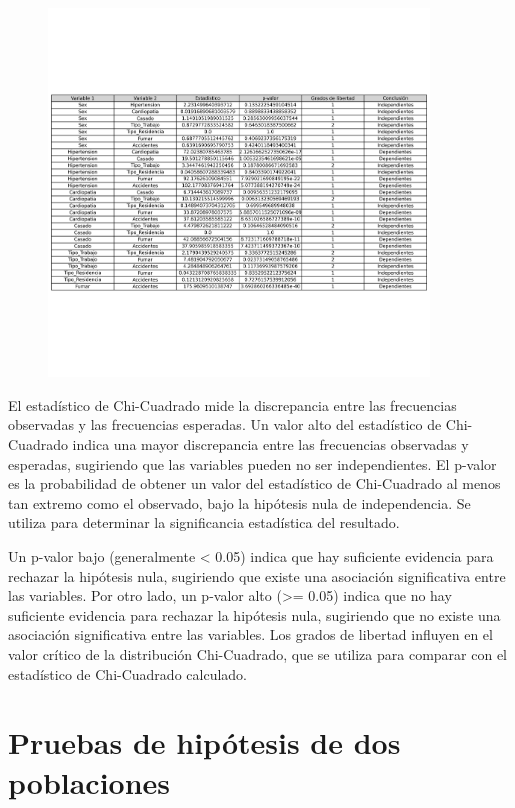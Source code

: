 \documentclass[a4paper, 12pt]{article}
\begin{document}
\begin{figure}[H]
    \centering
    \includegraphics[width=0.9\textwidth]{img/Tablas/test_chi_cuadrado.png}
\end{figure}
El estadístico de Chi-Cuadrado mide la discrepancia entre las frecuencias observadas y las frecuencias esperadas. Un valor alto del estadístico de Chi-Cuadrado indica una mayor discrepancia entre las frecuencias observadas y esperadas, sugiriendo que las variables pueden no ser independientes. El p-valor es la probabilidad de obtener un valor del estadístico de Chi-Cuadrado al menos tan extremo como el observado, bajo la hipótesis nula de independencia. Se utiliza para determinar la significancia estadística del resultado.

Un p-valor bajo (generalmente < 0.05) indica que hay suficiente evidencia para rechazar la hipótesis nula, sugiriendo que existe una asociación significativa entre las variables. Por otro lado, un p-valor alto (>= 0.05) indica que no hay suficiente evidencia para rechazar la hipótesis nula, sugiriendo que no existe una asociación significativa entre las variables. Los grados de libertad influyen en el valor crítico de la distribución Chi-Cuadrado, que se utiliza para comparar con el estadístico de Chi-Cuadrado calculado.


\newpage
\section{Pruebas de hipótesis de dos poblaciones}
\end{document}
